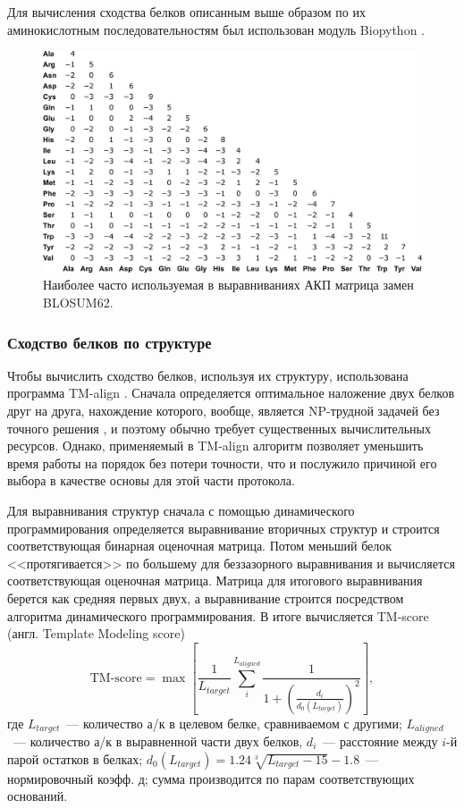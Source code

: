 \documentclass[a4paper,14pt]{article}         %
\begin{document}
Для вычисления сходства белков описанным выше образом по их аминокислотным последовательностям был использован модуль Biopython \cite{biopython}.
\begin{figure}[h] 
	\centering
	\includegraphics[width=0.6\linewidth]{pictures/BLOSUM62}
	\caption{Наиболее часто используемая в выравниваниях АКП матрица замен BLOSUM62.}
	\label{fig:blosum}
\end{figure}
\subsubsection{Сходство белков по структуре} \label{TM principle}
Чтобы вычислить сходство белков, используя их структуру, использована программа TM-align \cite{TM, TMalign}. Сначала определяется оптимальное наложение двух белков друг на друга, нахождение которого, вообще, является NP-трудной задачей без точного решения \cite{Lathrop1994}, и поэтому обычно требует существенных вычислительных ресурсов. Однако, применяемый в TM-align алгоритм позволяет уменьшить время работы на порядок без потери точности, что и послужило причиной его выбора в качестве основы для этой части протокола.

Для выравнивания структур сначала с помощью динамического программирования определяется выравнивание вторичных структур и строится соответствующая бинарная оценочная матрица. Потом меньший белок <<протягивается>> по большему для беззазорного выравнивания и вычисляется соответствующая оценочная матрица. Матрица для итогового выравнивания берется как средняя первых двух, а выравнивание строится посредством алгоритма динамического программирования. В итоге вычисляется TM-score (англ. Template Modeling score)\cite{Levitt1998} 
\begin{equation}
\label{tm-score}
\text{TM-score} = \max\left[\frac{1}{L_{target}}\sum_i^{L_{aligned}}\frac{1}{1+\left(\frac{d_i}{d_0(L_{target})}\right)^2}\right],
\end{equation}
где $L_{target}$~--- количество а/к в целевом белке, сравниваемом с другими; $L_{aligned}$~--- количество а/к в выравненной части двух белков, $d_i$~--- расстояние между $i$-й парой остатков в белках; $d_0(L_{target}) = 1.24\sqrt[3]{L_{target}-15}-1.8$~--- нормировочный коэфф. д; сумма производится по парам соответствующих оснований. 
\end{document}
